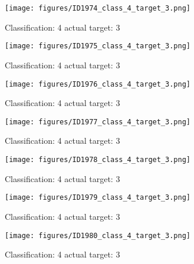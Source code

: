 \begin{figure}[h!]
\begin{center}
\texttt{[image: figures/ID1974\_class\_4\_target\_3.png]}
\end{center}
\caption{ Classification: 4 actual target: 3}
\label{fig:ID1974_class_4_target_3}
\end{figure}
\begin{figure}[h!]
\begin{center}
\texttt{[image: figures/ID1975\_class\_4\_target\_3.png]}
\end{center}
\caption{ Classification: 4 actual target: 3}
\label{fig:ID1975_class_4_target_3}
\end{figure}
\begin{figure}[h!]
\begin{center}
\texttt{[image: figures/ID1976\_class\_4\_target\_3.png]}
\end{center}
\caption{ Classification: 4 actual target: 3}
\label{fig:ID1976_class_4_target_3}
\end{figure}
\begin{figure}[h!]
\begin{center}
\texttt{[image: figures/ID1977\_class\_4\_target\_3.png]}
\end{center}
\caption{ Classification: 4 actual target: 3}
\label{fig:ID1977_class_4_target_3}
\end{figure}
\begin{figure}[h!]
\begin{center}
\texttt{[image: figures/ID1978\_class\_4\_target\_3.png]}
\end{center}
\caption{ Classification: 4 actual target: 3}
\label{fig:ID1978_class_4_target_3}
\end{figure}
\begin{figure}[h!]
\begin{center}
\texttt{[image: figures/ID1979\_class\_4\_target\_3.png]}
\end{center}
\caption{ Classification: 4 actual target: 3}
\label{fig:ID1979_class_4_target_3}
\end{figure}
\begin{figure}[h!]
\begin{center}
\texttt{[image: figures/ID1980\_class\_4\_target\_3.png]}
\end{center}
\caption{ Classification: 4 actual target: 3}
\label{fig:ID1980_class_4_target_3}
\end{figure}
